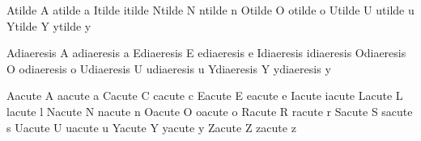  Atilde           {\buildtextaccent\texttilde A}
 atilde           {\buildtextaccent\texttilde a}
 Itilde           {\buildtextaccent\texttilde \dotlessI}
 itilde           {\buildtextaccent\texttilde \dotlessi}
 Ntilde           {\buildtextaccent\texttilde N}
 ntilde           {\buildtextaccent\texttilde n}
 Otilde           {\buildtextaccent\texttilde O}
 otilde           {\buildtextaccent\texttilde o}
 Utilde           {\buildtextaccent\texttilde U}
 utilde           {\buildtextaccent\texttilde u}
 Ytilde           {\buildtextaccent\texttilde Y}
 ytilde           {\buildtextaccent\texttilde y}

 Adiaeresis       {\buildtextaccent\textdiaeresis A}
 adiaeresis       {\buildtextaccent\textdiaeresis a}
 Ediaeresis       {\buildtextaccent\textdiaeresis E}
 ediaeresis       {\buildtextaccent\textdiaeresis e}
 Idiaeresis       {\buildtextaccent\textdiaeresis \dotlessI}
 idiaeresis       {\buildtextaccent\textdiaeresis \dotlessi}
 Odiaeresis       {\buildtextaccent\textdiaeresis O}
 odiaeresis       {\buildtextaccent\textdiaeresis o}
 Udiaeresis       {\buildtextaccent\textdiaeresis U}
 udiaeresis       {\buildtextaccent\textdiaeresis u}
 Ydiaeresis       {\buildtextaccent\textdiaeresis Y}
 ydiaeresis       {\buildtextaccent\textdiaeresis y}

 Aacute           {\buildtextaccent\textacute A}
 aacute           {\buildtextaccent\textacute a}
 Cacute           {\buildtextaccent\textacute C}
 cacute           {\buildtextaccent\textacute c}
 Eacute           {\buildtextaccent\textacute E}
 eacute           {\buildtextaccent\textacute e}
 Iacute           {\buildtextaccent\textacute \dotlessI}
 iacute           {\buildtextaccent\textacute \dotlessi}
 Lacute           {\buildtextaccent\textacute L}
 lacute           {\buildtextaccent\textacute l}
 Nacute           {\buildtextaccent\textacute N}
 nacute           {\buildtextaccent\textacute n}
 Oacute           {\buildtextaccent\textacute O}
 oacute           {\buildtextaccent\textacute o}
 Racute           {\buildtextaccent\textacute R}
 racute           {\buildtextaccent\textacute r}
 Sacute           {\buildtextaccent\textacute S}
 sacute           {\buildtextaccent\textacute s}
 Uacute           {\buildtextaccent\textacute U}
 uacute           {\buildtextaccent\textacute u}
 Yacute           {\buildtextaccent\textacute Y}
 yacute           {\buildtextaccent\textacute y}
 Zacute           {\buildtextaccent\textacute Z}
 zacute           {\buildtextaccent\textacute z}

